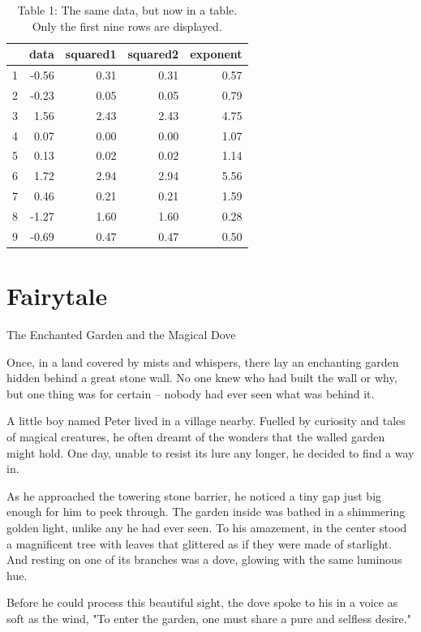 \documentclass[10pt, a4paper, titlepage]{article}
\begin{document}
\begin{table}[!ht]
\centering
\caption{Table 1: The same data, but now in a table. Only the first nine rows are
displayed.}
\begin{tabular}{rrrrr}
  \hline
 & data & squared1 & squared2 & exponent \\ 
  \hline
1 & -0.56 & 0.31 & 0.31 & 0.57 \\ 
  2 & -0.23 & 0.05 & 0.05 & 0.79 \\ 
  3 & 1.56 & 2.43 & 2.43 & 4.75 \\ 
  4 & 0.07 & 0.00 & 0.00 & 1.07 \\ 
  5 & 0.13 & 0.02 & 0.02 & 1.14 \\ 
  6 & 1.72 & 2.94 & 2.94 & 5.56 \\ 
  7 & 0.46 & 0.21 & 0.21 & 1.59 \\ 
  8 & -1.27 & 1.60 & 1.60 & 0.28 \\ 
  9 & -0.69 & 0.47 & 0.47 & 0.50 \\ 
   \hline
\end{tabular}
\end{table}

\newpage

\section{Fairytale}

The Enchanted Garden and the Magical Dove

Once, in a land covered by mists and whispers, there lay an enchanting garden hidden behind a great stone wall. No one knew who had built the wall or why, but one thing was for certain – nobody had ever seen what was behind it.

A little boy named Peter lived in a village nearby. Fuelled by curiosity and tales of magical creatures, he often dreamt of the wonders that the walled garden might hold. One day, unable to resist its lure any longer, he decided to find a way in.

As he approached the towering stone barrier, he noticed a tiny gap just big enough for him to peek through. The garden inside was bathed in a shimmering golden light, unlike any he had ever seen. To his amazement, in the center stood a magnificent tree with leaves that glittered as if they were made of starlight. And resting on one of its branches was a dove, glowing with the same luminous hue.

Before he could process this beautiful sight, the dove spoke to his in a voice as soft as the wind, "To enter the garden, one must share a pure and selfless desire."
\end{document}
